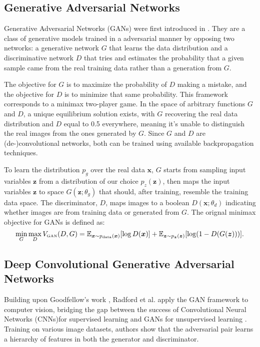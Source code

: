 \subsection{Generative Adversarial Networks} 
Generative Adversarial Networks (GANs) were first introduced in \cite{goodfellow2014generative}. They are a class of generative models trained in a adversarial manner by opposing two networks: a generative network $G$ that learns the data distribution and a discriminative network $D$ that tries and estimates the probability that a given sample came from the real training data rather than a generation from $G$. 
 
The objective for $G$ is to maximize the probability of $D$ making a mistake, and the objective for $D$ is to minimize that same probability. This framework corresponds to a minimax two-player game. In the space of arbitrary functions $G$ and $D$, a unique equilibrium solution exists, with $G$ recovering the real data distribution and $D$ equal to 0.5 everywhere, meaning it's unable to distinguish the real images from the ones generated by $G$. Since $G$ and $D$ are (de-)convolutional networks, both can be trained using available backpropagation techniques.

To learn the distribution $p_g$ over the real data $\bm{x}$, $G$ starts from sampling input variables $\bm{z}$ from a distribution of our choice $p_z(\bm{z})$, then maps the input variables $\bm{z}$ to space $G(\bm{z}; \theta_g)$ that should, after training, resemble the training data space. The discriminator, $D$, maps images to a boolean $D(\bm{x}; \theta_d)$ indicating whether images are from training data or generated from $G$. The orignal minimax objective for GANs is defined as:
\begin{equation}
\label{eq_gan}
\min_G \max_D V_{\text{\tiny GAN}}(D, G) = \mathbb{E}_{\bm{x} \sim p_{\text{data}}(\bm{x})}[\log D(\bm{x})] + \mathbb{E}_{\bm{z} \sim p_{\bm{z}}(\bm{z})}[\log (1 - D(G(\bm{z})))] .
\end{equation}

\subsection{Deep Convolutional Generative Adversarial Networks}
Building upon Goodfellow's work \cite{goodfellow2014generative}, Radford et al. apply the GAN framework to computer vision, bridging the gap between the success of Convolutional Neural Networks (CNNs)for supervised learning and GANs for unsupervised learning \cite{DBLP:journals/corr/RadfordMC15}. Training on various image datasets, authors show that the adversarial pair learns a hierarchy of features in both the generator and discriminator. 

